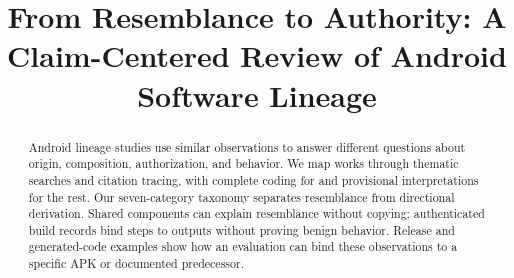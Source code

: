\documentclass[manuscript,screen,review]{acmart}
\title[Claim-Bounded Android Lineage Evidence]{From Resemblance to Authority: A Claim-Centered Review of Android Software Lineage}
\begin{document}
\begin{abstract}
Android lineage studies use similar observations to answer different questions about origin, composition, authorization, and behavior. We map \CorpusWorks{} works through thematic searches and citation tracing, with complete coding for \SemanticReadWorks{} and provisional interpretations for the rest. Our seven-category taxonomy separates resemblance from directional derivation. Shared components can explain resemblance without copying; authenticated build records bind steps to outputs without proving benign behavior. Release and generated-code examples show how an evaluation can bind these observations to a specific APK or documented predecessor.
\end{abstract}
\maketitle















\end{document}
